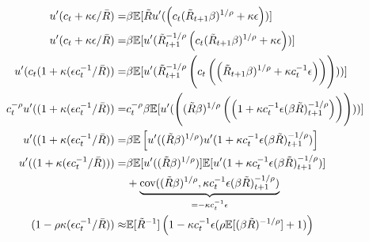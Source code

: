 \documentclass{article}
\begin{document}
 
\begin{align}
  u'(c_{t}+\kappa \epsilon/\bar{R}) = & \beta \mathbb{E}[\tilde{R}u'(\left(c_{t}(\tilde{R}_{t+1} \beta)^{1/\rho}+\kappa \epsilon\right))] \\
u'(c_{t}+\kappa \epsilon/\bar{R}) = & \beta \mathbb{E}[u'(\tilde{R}^{-1/\rho}_{t+1}\left(c_{t}(\tilde{R}_{t+1} \beta)^{1/\rho}+\kappa \epsilon\right))] \\
  u'(c_{t}(1+\kappa (\epsilon c_{t}^{-1}/\bar{R})) = & \beta \mathbb{E}[u'(\tilde{R}^{-1/\rho}_{t+1}\left(c_{t}\left(\left(\tilde{R}_{t+1} \beta)^{1/\rho}+\kappa c_{t}^{-1}\epsilon\right)\right)\right)))]\\
  c_{t}^{-\rho}u'((1+\kappa (\epsilon c_{t}^{-1}/\bar{R})) = & c_{t}^{-\rho}\beta \mathbb{E}[u'(\left((\tilde{R}\beta)^{1/\rho}\left(\left(1 +\kappa c_{t}^{-1}\epsilon(\beta \tilde{R})^{-1/\rho}_{t+1}\right)\right)\right)))] \\
  u'((1+\kappa (\epsilon c_{t}^{-1}/\bar{R})) = & \beta \mathbb{E}\left[u'((\tilde{R}\beta)^{1/\rho})u'(1 +\kappa c_{t}^{-1}\epsilon(\beta \tilde{R})^{-1/\rho}_{t+1})\right] \\  
  u'((1+\kappa (\epsilon c_{t}^{-1}/\bar{R}))) = & \beta \mathbb{E}[u'((\tilde{R}\beta)^{1/\rho})]\mathbb{E}[u'(1 +\kappa c_{t}^{-1}\epsilon(\beta \tilde{R})^{-1/\rho}_{t+1})] \notag \\ 
& + \underbrace{\text{cov}((\tilde{R}\beta)^{1/\rho},\kappa c_{t}^{-1}\epsilon(\beta \tilde{R})^{-1/\rho}_{t+1})}_{=-\kappa c_{t}^{-1} \epsilon}  \notag \\
  (1-\rho \kappa (\epsilon c_{t}^{-1}/\bar{R})) \approx & \mathbb{E}[\tilde{R}^{-1}]\left(1 -\kappa c_{t}^{-1} \epsilon (\rho\mathbb{E}[(\beta \tilde{R})^{-1/\rho}] +1)\right) 
\end{align}
\end{document}
